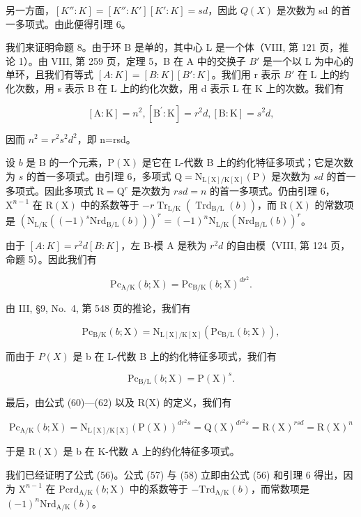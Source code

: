 另一方面，\([K'' : K] = [K'' : K'][K' : K] = sd\)，因此 \(Q(X)\) 是次数为 sd 的首一多项式。由此便得引理 6。

我们来证明命题 8。由于环 B 是单的，其中心 L 是一个体（VIII, 第 121 页，推论 1）。由 VIII, 第 259 页，定理 5，B 在 A 中的交换子 \(B'\) 是一个以 L 为中心的单环，且我们有等式 \([A:K]=[B:K][B':K]\)。我们用 r 表示 \(B'\) 在 L 上的约化次数，用 s 表示 B 在 L 上的约化次数，用 d 表示 L 在 K 上的次数。我们有

\[
[ \mathrm{A}: \mathrm{K} ] = n ^ {2}, [ \mathrm{B} ^ {\prime}: \mathrm{K} ] = r ^ {2} d, [ \mathrm{B}: \mathrm{K} ] = s ^ {2} d,
\]

因而 \(n^{2}=r^{2}s^{2}d^{2}\)，即 n=rsd。

设 \(b\) 是 B 的一个元素，\(\mathrm{P}(\mathrm{X})\) 是它在 L-代数 B 上的约化特征多项式；它是次数为 \(s\) 的首一多项式。由引理 6，多项式 \(\mathrm{Q} = \mathrm{N}_{\mathrm{L}[\mathrm{X}] / \mathrm{K}[\mathrm{X}]}(\mathrm{P})\) 是次数为 \(sd\) 的首一多项式。因此多项式 \(\mathrm{R} = \mathrm{Q}^r\) 是次数为 \(rsd = n\) 的首一多项式。仍由引理 6，\(\mathrm{X}^{n - 1}\) 在 \(\mathrm{R}(\mathrm{X})\) 中的系数等于 \(-r\operatorname{Tr}_{\mathrm{L} / \mathrm{K}}(\operatorname{Trd}_{\mathrm{B} / \mathrm{L}}(b))\)，而 \(\mathrm{R}(\mathrm{X})\) 的常数项是 \((\mathrm{N}_{\mathrm{L} / \mathrm{K}}((-1)^s\mathrm{Nrd}_{\mathrm{B} / \mathrm{L}}(b)))^r = (-1)^n\mathrm{N}_{\mathrm{L} / \mathrm{K}}(\mathrm{Nrd}_{\mathrm{B} / \mathrm{L}}(b))^r\)。

由于 \([A:K]=r^{2}d[B:K]\)，左 B-模 A 是秩为 \(r^{2}d\) 的自由模（VIII, 第 124 页，命题 5）。因此我们有

\[
\mathrm{Pc} _ {\mathrm{A/K}} (b; \mathrm{X}) = \mathrm{Pc} _ {\mathrm{B/K}} (b; \mathrm{X}) ^ {d r ^ {2}}.\tag{60}
\]

由 III, §9, No.~4, 第 548 页的推论，我们有

\[
\mathrm{Pc} _ {\mathrm{B/K}} (b; \mathrm{X}) = \mathrm{N} _ {\mathrm{L[X] / K[X]}} (\mathrm{Pc} _ {\mathrm{B/L}} (b; \mathrm{X})),\tag{61}
\]

而由于 \(P(X)\) 是 b 在 L-代数 B 上的约化特征多项式，我们有

\[
\mathrm{Pc} _ {\mathrm{B/L}} (b; \mathrm{X}) = \mathrm{P(X)} ^ {s}.\tag{62}
\]

最后，由公式 (60)---(62) 以及 R(X) 的定义，我们有

\[
\mathrm{Pc} _ {\mathrm{A/K}} (b; \mathrm{X}) = \mathrm{N} _ {\mathrm{L[X]/K[X]}} (\mathrm{P(X)}) ^ {d r ^ {2} s} = \mathrm{Q(X)} ^ {d r ^ {2} s} = \mathrm{R(X)} ^ {r s d} = \mathrm{R(X)} ^ {n}\tag{63}
\]

于是 \(\mathrm{R}(\mathrm{X})\) 是 b 在 K-代数 A 上的约化特征多项式。

我们已经证明了公式 (56)。公式 (57) 与 (58) 立即由公式 (56) 和引理 6 得出，因为 \(\mathrm{X}^{n - 1}\) 在 \(\mathrm{Pcrd}_{\mathrm{A / K}}(b;\mathrm{X})\) 中的系数等于 \(-\mathrm{Trd}_{\mathrm{A / K}}(b)\)，而常数项是 \((-1)^n\mathrm{Nrd}_{\mathrm{A / K}}(b)\)。


